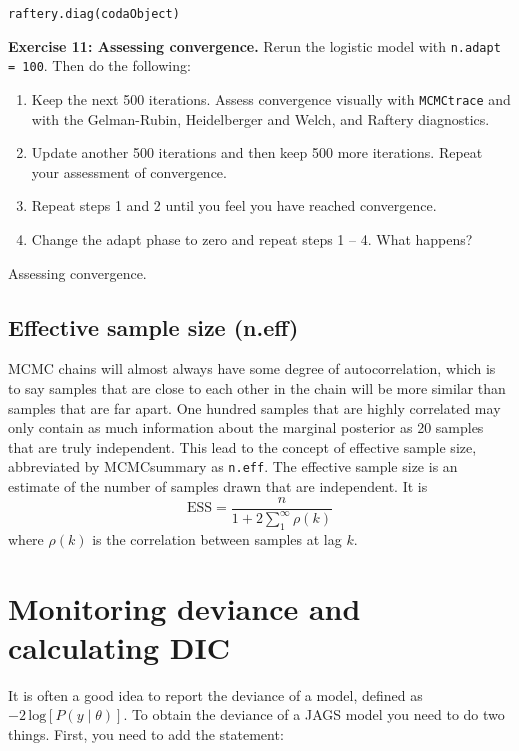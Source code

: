 \documentclass[12pt,english]{article}
\begin{document}
\bigskip
\noindent\texttt{raftery.diag(codaObject)}

\bigskip
\belowcaptionskip=-40pt
\begin{exercise}
\begin{mdframed}
\doublespacing
\textbf{Exercise 11: Assessing convergence.} Rerun the logistic model with \texttt{n.adapt = 100}. Then do the following:
\begin{enumerate}
\item Keep the next 500 iterations. Assess convergence visually with \texttt{MCMCtrace} and with the Gelman-Rubin, Heidelberger and Welch, and Raftery diagnostics.
\item Update another 500 iterations and then keep 500 more iterations. Repeat your assessment of convergence. 
\item Repeat steps 1 and 2 until you feel you have reached convergence.
\item Change the adapt phase to zero and repeat steps 1 -- 4. What happens?
\end{enumerate}
\end{mdframed}
\captionsetup{textformat=empty, labelformat=empty}
\caption[Assessing convergence]{Assessing convergence.}
\label{ex:assessing convergence}
\end{exercise}
\belowcaptionskip=0pt

\subsection{Effective sample size (n.eff)\label{n.eff}}
MCMC chains will almost always have some degree of autocorrelation, which is to say samples that are close to each other in the chain will be more similar than samples that are far apart.  One hundred samples that are highly correlated may only contain as much information about the marginal posterior as 20 samples that are truly independent.  This lead to the concept of effective sample size, abbreviated by MCMCsummary as \texttt{n.eff}.  The effective sample size is an estimate of the number of samples drawn that are independent.  It is $$\text{ESS} = \frac{n}{1+2\sum_1^\infty \rho(k)}$$ where $\rho(k)$ is the correlation between samples at lag $k$.

\section{Monitoring deviance and calculating DIC}

It is often a good idea to report the deviance of a model, defined as $-2\,\textrm{log}\left[P\left(y\mid\theta\right)\right]$. To obtain the deviance of a JAGS model you need to do two things. First, you need to add the statement:
\end{document}
